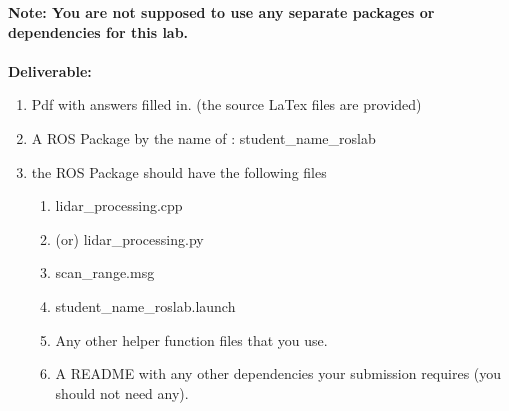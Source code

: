 \documentclass[letta4 paper]{article}
\begin{document}
\textbf{Note: You are not supposed to use any separate packages or dependencies for this lab. }
\\
\\

\textbf{Deliverable:}
\begin{enumerate}
    \item Pdf with answers filled in. (the source LaTex files are provided)
    \item A ROS Package by the name of : student\_name\_roslab 
    \item the ROS Package should have the following files
    \begin{enumerate}
        \item lidar\_processing.cpp
        \item (or) lidar\_processing.py
        \item scan\_range.msg
        \item student\_name\_roslab.launch
        \item Any other helper function files that you use.
        \item A README with any other dependencies your submission requires (you should not need any). 
    \end{enumerate}{}
\end{enumerate}{}
\end{document}
